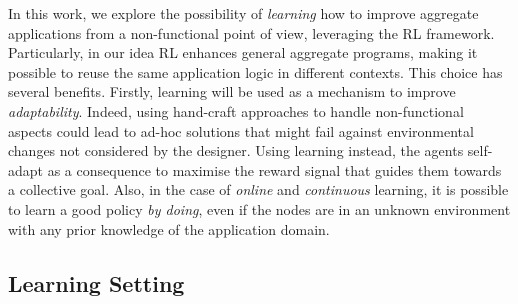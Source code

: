 In this work, we explore the possibility of \emph{learning} 
 how to improve aggregate applications from a non-functional point of view, 
 leveraging the \ac{RL} framework.
%
%
Particularly, in our idea \ac{RL} enhances general aggregate programs, 
 making it possible to reuse the same application logic in different contexts.
%
This choice has several benefits.
 Firstly, learning will be used as a mechanism to improve \emph{adaptability}. 
 Indeed, using hand-craft approaches to handle non-functional aspects 
 could lead to ad-hoc solutions that might fail against environmental 
 changes not considered by the designer.
%
Using learning instead, the agents self-adapt as a consequence 
 to maximise the reward signal that guides them towards a collective goal. 
%
Also, in the case of \emph{online} and \emph{continuous} learning, 
 it is possible to learn a good policy \emph{by doing}, 
 even if the nodes are in an unknown environment with any prior knowledge of the application domain.
%

\subsection{Learning Setting}\label{sec:learning-setting}

